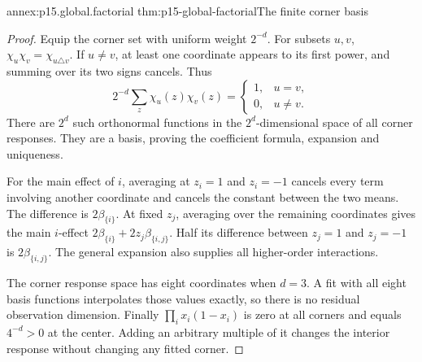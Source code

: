 \begin{annexitem}{annex:p15.global.factorial}
 {thm:p15-global-factorial}{The finite corner basis}
\begin{proof}
Equip the corner set with uniform weight \(2^{-d}\).
For subsets \(u,v\),
\(\chi_u\chi_v=\chi_{u\triangle v}\).
If \(u\ne v\), at least one coordinate appears to its first power,
and summing over its two signs cancels. Thus
\[
 2^{-d}\sum_z\chi_u(z)\chi_v(z)
   =\begin{cases}1,&u=v,\\0,&u\ne v.\end{cases}
\]
There are \(2^d\) such orthonormal functions in the \(2^d\)-dimensional
space of all corner responses. They are a basis, proving the coefficient
formula, expansion and uniqueness.

For the main effect of \(i\), averaging at \(z_i=1\) and \(z_i=-1\)
cancels every term involving another coordinate and cancels the constant
between the two means. The difference is \(2\beta_{\{i\}}\).
At fixed \(z_j\), averaging over the remaining coordinates gives the
main \(i\)-effect
\(2\beta_{\{i\}}+2z_j\beta_{\{i,j\}}\).
Half its difference between \(z_j=1\) and \(z_j=-1\) is
\(2\beta_{\{i,j\}}\).
The general expansion also supplies all higher-order interactions.

The corner response space has eight coordinates when \(d=3\).
A fit with all eight basis functions interpolates those values exactly,
so there is no residual observation dimension.
Finally \(\prod_i x_i(1-x_i)\) is zero at all corners and equals
\(4^{-d}>0\) at the center. Adding an arbitrary multiple of it changes
the interior response without changing any fitted corner.
\end{proof}
\end{annexitem}

